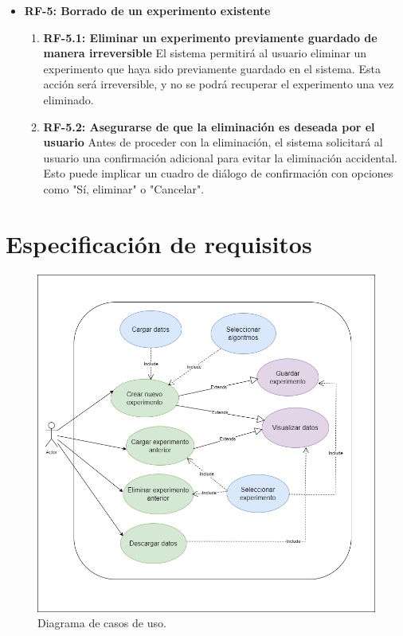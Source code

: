 \begin{itemize}
    \item \textbf{RF-5: Borrado de un experimento existente} 
    \begin{enumerate}
        \item \textbf{RF-5.1: Eliminar un experimento previamente guardado de manera irreversible} 
        El sistema permitirá al usuario eliminar un experimento que haya sido previamente guardado en el sistema. Esta acción será irreversible, y no se podrá recuperar el experimento una vez eliminado.
        \item \textbf{RF-5.2: Asegurarse de que la eliminación es deseada por el usuario} 
		Antes de proceder con la eliminación, el sistema solicitará al usuario una confirmación adicional para evitar la eliminación accidental. Esto puede implicar un cuadro de diálogo de confirmación con opciones como "Sí, eliminar" o "Cancelar".
    \end{enumerate}


\end{itemize}

\section{Especificación de requisitos}

\begin{figure}[htbp]
    \centering
    \includegraphics[width=1\linewidth]{img/Diagrama_CDU.png}
    \caption{Diagrama de casos de uso.}
    \label{Diagrama de casos de uso}
\end{figure}


